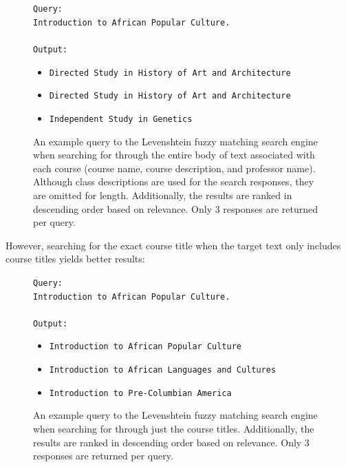 \documentclass[
	a4paper, %
	10pt, %
	unnumberedsections, %
	twoside, %
]{LTJournalArticle}
\begin{document}
\enter

\enter

\begin{figure}[h]
	\begin{center}
		\texttt{Query:} \\
		\texttt{Introduction to African Popular Culture.} \\
		\texttt{}\\
		\texttt{Output:} 
		\begin{itemize}
			\item \texttt{Directed Study in History of Art and Architecture}
			\item \texttt{Directed Study in History of Art and Architecture}
			\item \texttt{Independent Study in Genetics}
		\end{itemize}		
	\end{center}
	\caption{An example query to the Levenshtein fuzzy matching search engine when searching for through the entire body of text associated with each course (course name, course description, and professor name). Although class descriptions are used for the search responses, they are omitted for length. Additionally, the results are ranked in descending order based on relevance. Only 3 responses are returned per query.}
\end{figure}

However, searching for the exact course title when the target text only includes course titles yields better results:

\begin{figure}[h]
	\begin{center}
		\texttt{Query:} \\
		\texttt{Introduction to African Popular Culture.} \\
		\texttt{}\\
		\texttt{Output:} 
		\begin{itemize}
			\item \texttt{Introduction to African Popular Culture}
			\item \texttt{Introduction to African Languages and Cultures}
			\item \texttt{Introduction to Pre-Columbian America}
		\end{itemize}		
	\end{center}
	\caption{An example query to the Levenshtein fuzzy matching search engine when searching for through just the course titles. Additionally, the results are ranked in descending order based on relevance. Only 3 responses are returned per query.}
\end{figure}
\end{document}
